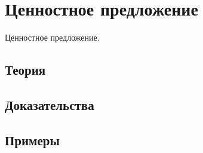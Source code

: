 
\section{Ценностное предложение}
\label{sec:2.6.11-value-proposition}

\begin{ticket}
Ценностное предложение.
\end{ticket}

\subsection*{Теория}

\subsection*{Доказательства}

\subsection*{Примеры}
